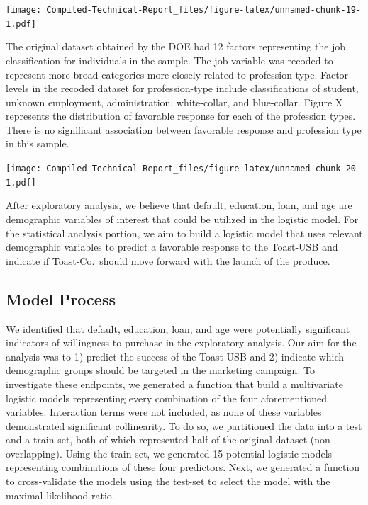 \documentclass[]{article}
\begin{document}
\texttt{[image: Compiled-Technical-Report\_files/figure-latex/unnamed-chunk-19-1.pdf]}

The original dataset obtained by the DOE had 12 factors representing the
job classification for individuals in the sample. The job variable was
recoded to represent more broad categories more closely related to
profession-type. Factor levels in the recoded dataset for
profession-type include classifications of student, unknown employment,
administration, white-collar, and blue-collar. Figure X represents the
distribution of favorable response for each of the profession types.
There is no significant association between favorable response and
profession type in this sample.

\texttt{[image: Compiled-Technical-Report\_files/figure-latex/unnamed-chunk-20-1.pdf]}

After exploratory analysis, we believe that default, education, loan,
and age are demographic variables of interest that could be utilized in
the logistic model. For the statistical analysis portion, we aim to
build a logistic model that uses relevant demographic variables to
predict a favorable response to the Toast-USB and indicate if
Toast-Co.~should move forward with the launch of the produce.

\hypertarget{model-process}{%
\subsection{Model Process}\label{model-process}}

We identified that default, education, loan, and age were potentially
significant indicators of willingness to purchase in the exploratory
analysis. Our aim for the analysis was to 1) predict the success of the
Toast-USB and 2) indicate which demographic groups should be targeted in
the marketing campaign. To investigate these endpoints, we generated a
function that build a multivariate logistic models representing every
combination of the four aforementioned variables. Interaction terms were
not included, as none of these variables demonstrated significant
collinearity. To do so, we partitioned the data into a test and a train
set, both of which represented half of the original dataset
(non-overlapping). Using the train-set, we generated 15 potential
logistic models representing combinations of these four predictors.
Next, we generated a function to cross-validate the models using the
test-set to select the model with the maximal likelihood ratio.
\end{document}
